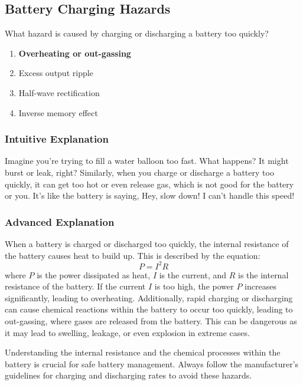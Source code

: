 \subsection{Battery Charging Hazards}
\label{T0A10}

\begin{tcolorbox}[colback=gray!10!white,colframe=black!75!black,title=T0A10]
What hazard is caused by charging or discharging a battery too quickly?
\begin{enumerate}[label=\Alph*)]
    \item \textbf{Overheating or out-gassing}
    \item Excess output ripple
    \item Half-wave rectification
    \item Inverse memory effect
\end{enumerate}
\end{tcolorbox}

\subsubsection{Intuitive Explanation}
Imagine you're trying to fill a water balloon too fast. What happens? It might burst or leak, right? Similarly, when you charge or discharge a battery too quickly, it can get too hot or even release gas, which is not good for the battery or you. It's like the battery is saying, Hey, slow down! I can't handle this speed!

\subsubsection{Advanced Explanation}
When a battery is charged or discharged too quickly, the internal resistance of the battery causes heat to build up. This is described by the equation:
\[
P = I^2 R
\]
where \( P \) is the power dissipated as heat, \( I \) is the current, and \( R \) is the internal resistance of the battery. If the current \( I \) is too high, the power \( P \) increases significantly, leading to overheating. Additionally, rapid charging or discharging can cause chemical reactions within the battery to occur too quickly, leading to out-gassing, where gases are released from the battery. This can be dangerous as it may lead to swelling, leakage, or even explosion in extreme cases.

Understanding the internal resistance and the chemical processes within the battery is crucial for safe battery management. Always follow the manufacturer's guidelines for charging and discharging rates to avoid these hazards.

